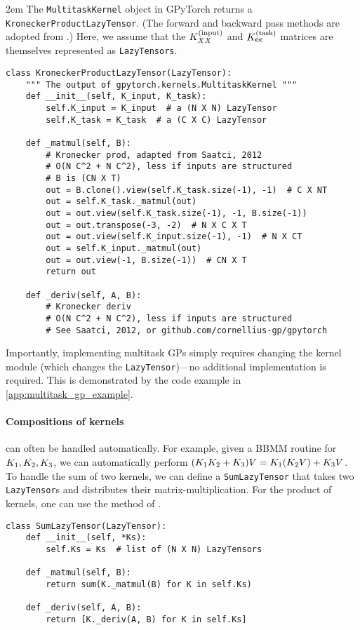 \emergencystretch 2em
The {\tt MultitaskKernel} object in GPyTorch returns a {\tt KroneckerProductLazyTensor}.
(The forward and backward pass methods are adopted from \citet{saatcci2012scalable}.)
Here, we assume that the $K^{(\text{input})}_{XX}$ and $K^{(\text{task})}_{\mathbf{c}\mathbf{c}}$ matrices are themselves represented as {\tt LazyTensors}.
%
\begin{verbatim}
class KroneckerProductLazyTensor(LazyTensor):
    """ The output of gpytorch.kernels.MultitaskKernel """
    def __init__(self, K_input, K_task):
        self.K_input = K_input  # a (N X N) LazyTensor
        self.K_task = K_task  # a (C X C) LazyTensor

    def _matmul(self, B):
        # Kronecker prod, adapted from Saatci, 2012
        # O(N C^2 + N C^2), less if inputs are structured
        # B is (CN X T)
        out = B.clone().view(self.K_task.size(-1), -1)  # C X NT
        out = self.K_task._matmul(out)
        out = out.view(self.K_task.size(-1), -1, B.size(-1))
        out = out.transpose(-3, -2)  # N X C X T
        out = out.view(self.K_input.size(-1), -1)  # N X CT
        out = self.K_input._matmul(out)
        out = out.view(-1, B.size(-1))  # CN X T
        return out

    def _deriv(self, A, B):
        # Kronecker deriv
        # O(N C^2 + N C^2), less if inputs are structured
        # See Saatci, 2012, or github.com/cornellius-gp/gpytorch
\end{verbatim}
%
\noindent
Importantly, implementing multitask GPs simply requires changing the kernel module (which changes the {\tt LazyTensor})---no additional implementation is required.
This is demonstrated by the code example in \cref{app:multitask_gp_example}.

\paragraph{Compositions of kernels} can often be handled automatically.
For example, given a BBMM routine for $K_{1},K_{2},K_{3}$, we can automatically perform $(K_{1}K_{2}+K_{3}) V = K_{1}(K_{2} V ) + K_{3} V$.
To handle the sum of two kernels, we can define a {\tt SumLazyTensor} that takes two {\tt LazyTensor}s and distributes their matrix-multiplication.
For the product of kernels, one can use the method of \citet{gardner2018product}.
%
\begin{verbatim}
class SumLazyTensor(LazyTensor):
    def __init__(self, *Ks):
        self.Ks = Ks  # list of (N X N) LazyTensors

    def _matmul(self, B):
        return sum(K._matmul(B) for K in self.Ks)

    def _deriv(self, A, B):
        return [K._deriv(A, B) for K in self.Ks]
\end{verbatim}

